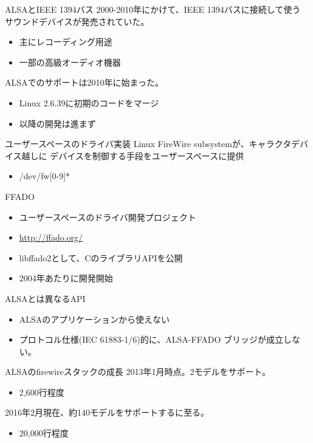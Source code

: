 \begin{frame}{ALSAとIEEE 1394バス}
  2000-2010年にかけて、IEEE 1394バスに接続して使う
  サウンドデバイスが発売されていた。
  \begin{itemize}
  \item 主にレコーディング用途
  \item 一部の高級オーディオ機器
  \end{itemize}
  ALSAでのサポートは2010年に始まった。
  \begin{itemize}
  \item Linux 2.6.39に初期のコードをマージ
  \item 以降の開発は進まず
  \end{itemize}
\end{frame}

\begin{frame}{ユーザースペースのドライバ実装}
  Linux FireWire subsystemが、キャラクタデバイス越しに
  デバイスを制御する手段をユーザースペースに提供
  \begin{itemize}
  \item /dev/fw[0-9]*
  \end{itemize}
  FFADO
  \begin{itemize}
  \item ユーザースペースのドライバ開発プロジェクト
  \item \url{http://ffado.org/}
  \item libffado2として、CのライブラリAPIを公開
  \item 2004年あたりに開発開始
  \end{itemize}
  ALSAとは異なるAPI
  \begin{itemize}
  \item ALSAのアプリケーションから使えない
  \item プロトコル仕様(IEC 61883-1/6)的に、ALSA-FFADO
        ブリッジが成立しない。
  \end{itemize}
\end{frame}

\begin{frame}{ALSAのfirewireスタックの成長}
  2013年1月時点。2モデルをサポート。
  \begin{itemize}
  \item 2,600行程度
  \end{itemize}
  2016年2月現在、約140モデルをサポートするに至る。
  \begin{itemize}
  \item 20,000行程度
  \end{itemize}
\end{frame}

